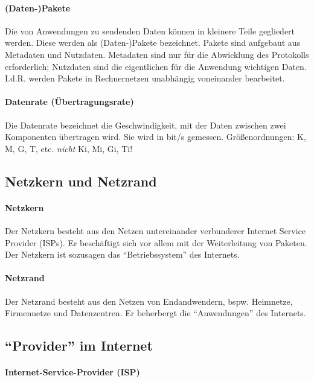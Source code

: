 \documentclass[a4paper, 14pt]{article}
\begin{document}
	\paragraph{(Daten-)Pakete}

	Die von Anwendungen zu sendenden Daten können in kleinere Teile gegliedert werden.
	Diese werden als (Daten-)Pakete bezeichnet.
	Pakete sind aufgebaut aus Metadaten und Nutzdaten.
	Metadaten sind nur für die Abwicklung des Protokolls erforderlich; Nutzdaten sind die eigentlichen für die Anwendung wichtigen Daten.
	I.d.R. werden Pakete in Rechnernetzen unabhängig voneinander bearbeitet.

	\paragraph{Datenrate (Übertragungsrate)}

	Die Datenrate bezeichnet die Geschwindigkeit, mit der Daten zwischen zwei Komponenten übertragen wird.
	Sie wird in bit/s gemessen.
	Größenordnungen: K, M, G, T, etc. \emph{nicht} Ki, Mi, Gi, Ti!

	\subsection{Netzkern und Netzrand}

	\paragraph{Netzkern}

	Der Netzkern besteht aus den Netzen untereinander verbunderer Internet Service Provider (ISPs).
	Er beschäftigt sich vor allem mit der Weiterleitung von Paketen.
	Der Netzkern ist sozusagen das \enquote{Betriebssystem} des Internets.

	\paragraph{Netzrand}

	Der Netzrand besteht aus den Netzen von Endandwendern, bspw. Heimnetze, Firmennetze und Datenzentren.
	Er beherbergt die \enquote{Anwendungen} des Internets.

	\subsection{\enquote{Provider} im Internet}

	\paragraph{Internet-Service-Provider (ISP)}
\end{document}
